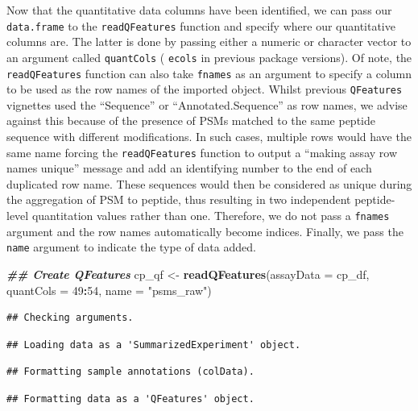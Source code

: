 \documentclass[9pt,a4paper,]{extarticle}
\newenvironment{Shaded}{\begin{snugshade}}{\end{snugshade}}
\newcommand{\AttributeTok}[1]{\textcolor[rgb]{0.13,0.29,0.53}{#1}}
\newcommand{\DecValTok}[1]{\textcolor[rgb]{0.00,0.00,0.81}{#1}}
\newcommand{\DocumentationTok}[1]{\textcolor[rgb]{0.56,0.35,0.01}{\textbf{\textit{#1}}}}
\newcommand{\FunctionTok}[1]{\textcolor[rgb]{0.13,0.29,0.53}{\textbf{#1}}}
\newcommand{\NormalTok}[1]{#1}
\newcommand{\OtherTok}[1]{\textcolor[rgb]{0.56,0.35,0.01}{#1}}
\newcommand{\SpecialCharTok}[1]{\textcolor[rgb]{0.81,0.36,0.00}{\textbf{#1}}}
\newcommand{\StringTok}[1]{\textcolor[rgb]{0.31,0.60,0.02}{#1}}
\begin{document}
Now that the quantitative data columns have been identified, we can pass our
\texttt{data.frame} to the \texttt{readQFeatures} function and specify where our quantitative
columns are. The latter is done by passing either a numeric or character vector
to an argument called \texttt{quantCols} ( \texttt{ecols} in previous package versions).
Of note, the \texttt{readQFeatures} function can also take \texttt{fnames} as an argument to
specify a column to be used as the row names of the imported
object. Whilst previous \texttt{QFeatures} vignettes used the ``Sequence'' or
``Annotated.Sequence'' as row names, we advise against this because of the presence
of PSMs matched to the same peptide sequence with different modifications. In such
cases, multiple rows would have the same name forcing the \texttt{readQFeatures} function
to output a ``making assay row names unique'' message and add an identifying number
to the end of each duplicated row name. These sequences would then be considered
as unique during the aggregation of PSM to peptide, thus resulting in two independent
peptide- level quantitation values rather than one. Therefore, we do not pass a
\texttt{fnames} argument and the row names automatically become indices. Finally, we
pass the \texttt{name} argument to indicate the type of data added.

\begin{Shaded}
\begin{Highlighting}[]
\DocumentationTok{\#\# Create QFeatures }
\NormalTok{cp\_qf }\OtherTok{\textless{}{-}} \FunctionTok{readQFeatures}\NormalTok{(}\AttributeTok{assayData =}\NormalTok{ cp\_df,}
                       \AttributeTok{quantCols =} \DecValTok{49}\SpecialCharTok{:}\DecValTok{54}\NormalTok{,}
                       \AttributeTok{name =} \StringTok{"psms\_raw"}\NormalTok{)}
\end{Highlighting}
\end{Shaded}

\begin{verbatim}
## Checking arguments.
\end{verbatim}

\begin{verbatim}
## Loading data as a 'SummarizedExperiment' object.
\end{verbatim}

\begin{verbatim}
## Formatting sample annotations (colData).
\end{verbatim}

\begin{verbatim}
## Formatting data as a 'QFeatures' object.
\end{verbatim}
\end{document}
